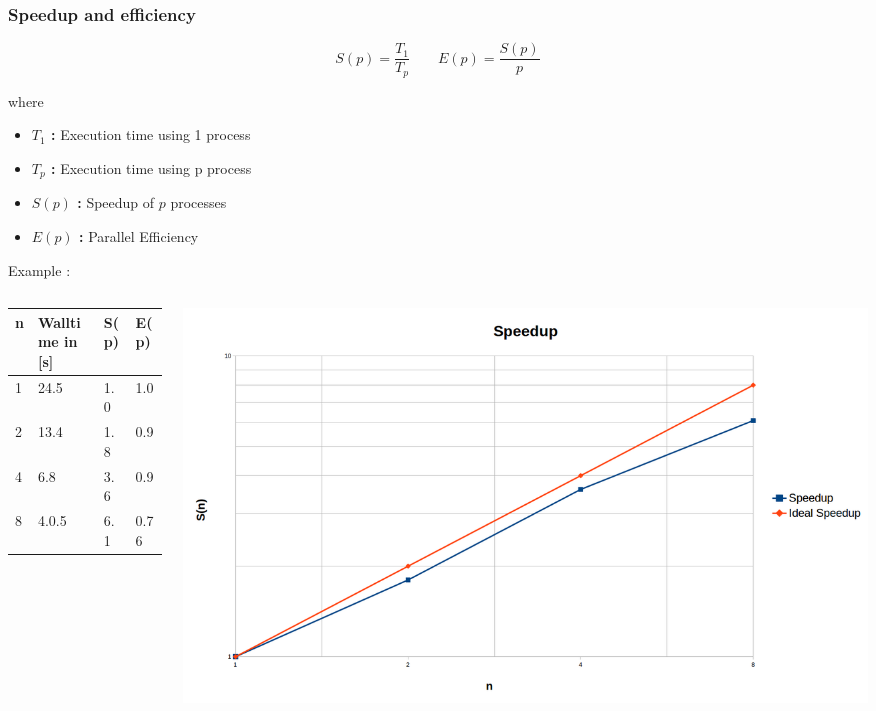 \begin{frame}
\frametitle{Speedup and efficiency}

\[
S(p) = \frac{T_{1}}{T_{p}} \qquad E(p) = \frac{S(p)}{p}
\]

where

\begin{itemize}
	\item{\textbf{$T_1$ :} Execution time using 1 process }
	\item{\textbf{$T_p$ :} Execution time using p process }
	\item{\textbf{$S(p)$ :} Speedup of $p$ processes }
	\item{\textbf{$E(p)$ :} Parallel Efficiency }
\end{itemize}

Example :

\begin{columns}
    \begin{column}{0.47\textwidth}
\begin{tabular}{| l | l | l | l |}
\hline
 \textbf{n} & \textbf{Walltime in [s]} & \textbf{S(p)}& \textbf{E(p)} \\
\hline
\hline
1 & 24.5 & 1.0 & 1.0\\
\hline
2 & 13.4 & 1.8 & 0.9\\
\hline
4 & 6.8 & 3.6 & 0.9\\
\hline
8 & 4.0.5 & 6.1 & 0.76\\
\hline
\end{tabular}
    \end{column}
    \begin{column}{0.5\textwidth}
        \includegraphics[width=\textwidth]{Day0/images/speedup.png} 
    \end{column}
\end{columns}
\end{frame}

